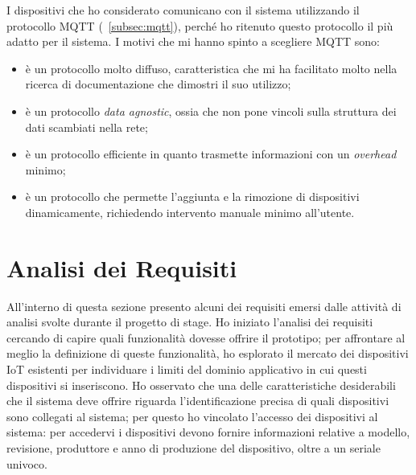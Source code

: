 I dispositivi che ho considerato comunicano con il sistema utilizzando il protocollo MQTT (~\ref{subsec:mqtt}), perché ho ritenuto questo protocollo il più adatto per il sistema.
I motivi che mi hanno spinto a scegliere MQTT sono:
\begin{itemize}
	\item è un protocollo molto diffuso, caratteristica che mi ha facilitato molto nella ricerca di documentazione che dimostri il suo utilizzo;
	\item è un protocollo \emph{data agnostic}, ossia che non pone vincoli sulla struttura dei dati scambiati nella rete;
	\item è un protocollo efficiente in quanto trasmette informazioni con un \emph{overhead} minimo;
	\item è un protocollo che permette l'aggiunta e la rimozione di dispositivi dinamicamente, richiedendo intervento manuale minimo all'utente.
\end{itemize}

\section{Analisi dei Requisiti}
\label{ar}


All'interno di questa sezione presento alcuni dei requisiti emersi dalle attività di analisi svolte durante il progetto di stage.
Ho iniziato l'analisi dei requisiti cercando di capire quali funzionalità dovesse offrire il prototipo; per affrontare al meglio la definizione di queste funzionalità, ho esplorato il mercato dei dispositivi IoT esistenti per individuare i limiti del dominio applicativo in cui questi dispositivi si inseriscono.
Ho osservato che una delle caratteristiche desiderabili che il sistema deve offrire riguarda l'identificazione precisa di quali dispositivi sono collegati al sistema; per questo ho vincolato l'accesso dei dispositivi al sistema: per accedervi i dispositivi devono fornire informazioni relative a modello, revisione, produttore e anno di produzione del dispositivo, oltre a un seriale univoco.

